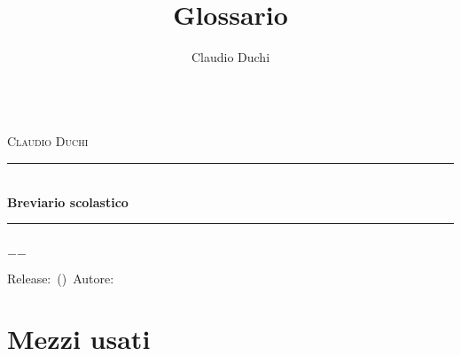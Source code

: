 \documentclass[twoside,11pt]{book}
\title{Glossario}
\author{Claudio Duchi}
\date{\datetime}
\makeatletter
\newcommand{\HRule}{\rule{\linewidth}{0.5mm}}
\renewcommand\frontmatter{%
 	\cleardoublepage
 	\@mainmatterfalse
 }
\renewcommand\mainmatter{%
 	\cleardoublepage
 	\@mainmattertrue
 }
\makeatother
\begin{document}
		\frontmatter
		\hypersetup{pageanchor=false}
		\begin{titlepage}\parindent=0pt
			\centering
	\begin{center}
	\Lgrandedue\\[1cm]
	\textsc{\LARGE Claudio Duchi}\\[1.2cm]
	\HRule \\[0.4cm]
	{ \huge \bfseries Breviario scolastico}\\[0.4cm]
	\HRule \\[1.2cm]
	\vfill
	{\large $-$\DTMnow$-$}	
\end{center}
{\centering
	Release:\gitReln\ (\gitAbbrevHash)\ Autore:\gitAuthorName\ 
	\gitCommitterDate \\
}
		\end{titlepage}

\frontmatter
		\CDcopyright
		\tableofcontents
			\mainmatter
\cleardoublepage
\glsaddall	
\twocolumn
\printglossaries
\onecolumn		
\nocite{*}
\printbibliography
\appendix
\chapter{Mezzi usati}
\CDMezziUsati
\end{document}
